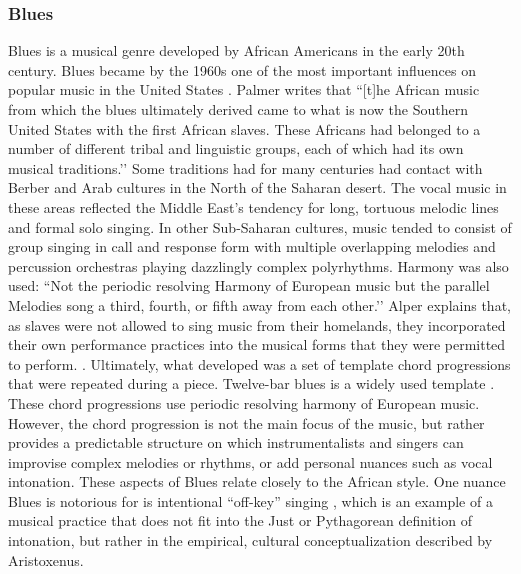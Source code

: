 \subsubsection{Blues}
Blues is a musical genre developed by African Americans in the early 20th century. Blues became by the 1960s one of the most important influences on popular music in the United States \cite{blues}. Palmer writes that ``[t]he African music from which the blues ultimately derived came to what is now the Southern United States with the first African slaves. These Africans had belonged to a number of different tribal and linguistic groups, each of which had its own musical traditions.’’ \cite[][p.~25]{palmer1981deep} Some traditions had for many centuries had contact with Berber and Arab cultures in the North of the Saharan desert. The vocal music in these areas reflected the Middle East’s tendency for long, tortuous melodic lines and formal solo singing. In other Sub-Saharan cultures, music tended to consist of group singing in call and response form with multiple overlapping melodies and percussion orchestras playing dazzlingly complex polyrhythms. Harmony was also used: ``Not the periodic resolving Harmony of European music but the parallel Melodies song a third, fourth, or fifth away from each other.’’ \cite[][p.~27]{palmer1981deep} Alper explains that, as slaves were not allowed to sing music from their homelands, they incorporated their own performance practices into the musical forms that they were permitted to perform. \cite{alper2005flexibility}. Ultimately, what developed was a set of template chord progressions that were repeated during a piece. Twelve-bar blues is a widely used template \cite{alper2005flexibility}. These chord progressions use periodic resolving harmony of European music. However, the chord progression is not the main focus of the music, but rather provides a predictable structure on which instrumentalists and singers can improvise complex melodies or rhythms, or add personal nuances such as vocal intonation. These aspects of Blues relate closely to the African style. One nuance Blues is notorious for is intentional ``off-key'' singing \cite{autotuneBritannica}, which is an example of a musical practice that does not fit into the Just or Pythagorean definition of intonation, but rather in the empirical, cultural conceptualization described by Aristoxenus.

